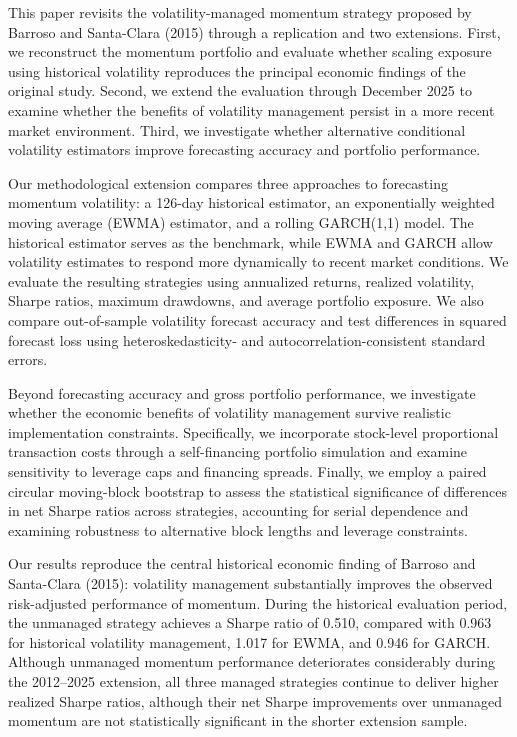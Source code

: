 \documentclass[11pt]{article}
\begin{document}
This paper revisits the volatility-managed momentum
strategy proposed by Barroso and Santa-Clara (2015)
through a replication and two extensions. First, we
reconstruct the momentum portfolio and evaluate
whether scaling exposure using historical volatility
reproduces the principal economic findings of the
original study. Second, we extend the evaluation
through December 2025 to examine whether the
benefits of volatility management persist in a
more recent market environment. Third, we
investigate whether alternative conditional
volatility estimators improve forecasting
accuracy and portfolio performance.

Our methodological extension compares three approaches to forecasting momentum volatility: a 126-day historical estimator, an exponentially weighted moving average (EWMA) estimator, and a rolling GARCH(1,1) model. The historical estimator serves as the benchmark, while EWMA and GARCH allow volatility estimates to respond more dynamically to recent market conditions. We evaluate the resulting strategies using annualized returns, realized volatility, Sharpe ratios, maximum drawdowns, and average portfolio exposure. We also compare out-of-sample volatility forecast accuracy and test differences in squared forecast loss using heteroskedasticity- and autocorrelation-consistent standard errors.

Beyond forecasting accuracy and gross portfolio performance, we investigate whether the economic benefits of volatility management survive realistic implementation constraints. Specifically, we incorporate stock-level proportional transaction costs through a self-financing portfolio simulation and examine sensitivity to leverage caps and financing spreads. Finally, we employ a paired circular moving-block bootstrap to assess the statistical significance of differences in net Sharpe ratios across strategies, accounting for serial dependence and examining robustness to alternative block lengths and leverage constraints.

Our results reproduce the central historical economic
finding of Barroso and Santa-Clara (2015):
volatility management substantially improves
the observed risk-adjusted performance of momentum.
During the historical evaluation period,
the unmanaged strategy achieves a Sharpe
ratio of 0.510, compared with 0.963 for
historical volatility management, 1.017
for EWMA, and 0.946 for GARCH. Although
unmanaged momentum performance deteriorates
considerably during the 2012--2025
extension, all three managed strategies
continue to deliver higher realized
Sharpe ratios, although their net Sharpe improvements over unmanaged momentum are not statistically significant in the shorter extension sample.
\end{document}
